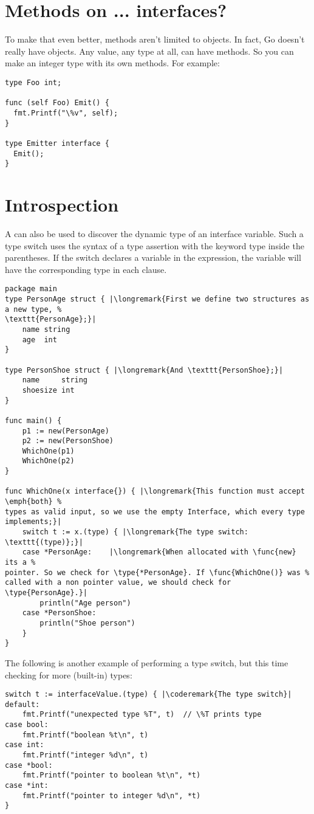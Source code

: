 \section{Methods on ... interfaces?}

To make that even better, methods aren't limited to objects. In fact, Go
doesn't really have objects. Any value, any type at all, can have methods. So
you can make an integer type with its own methods. For example:

\begin{lstlisting}
type Foo int;

func (self Foo) Emit() {
  fmt.Printf("\%v", self);
}

type Emitter interface {
  Emit();
}
\end{lstlisting}

\section{Introspection}
A  can also be used to discover the dynamic type of an interface
variable. Such a type switch uses
the syntax of a type assertion with the keyword type inside the
parentheses. If the switch declares a variable in the expression, the
variable will have the corresponding type in each clause.
\begin{lstlisting}[caption=Dynamically find out the type]
package main
type PersonAge struct { |\longremark{First we define two structures as a new type, %
\texttt{PersonAge};}|
	name string
	age  int
}

type PersonShoe struct { |\longremark{And \texttt{PersonShoe};}|
	name     string
	shoesize int
}

func main() {
	p1 := new(PersonAge)
	p2 := new(PersonShoe)
	WhichOne(p1)
	WhichOne(p2)
}

func WhichOne(x interface{}) { |\longremark{This function must accept \emph{both} %
types as valid input, so we use the empty Interface, which every type implements;}|
	switch t := x.(type) { |\longremark{The type switch: \texttt{(type)};}|
	case *PersonAge:	|\longremark{When allocated with \func{new} its a %
pointer. So we check for \type{*PersonAge}. If \func{WhichOne()} was %
called with a non pointer value, we should check for \type{PersonAge}.}|
		println("Age person")
	case *PersonShoe:
		println("Shoe person")
	}
}
\end{lstlisting}
\showremarks

The following is another example of performing a type switch, but this
time checking for more (built-in) types:
\begin{lstlisting}[caption=A more generic type switch]
switch t := interfaceValue.(type) { |\coderemark{The type switch}|
default:
    fmt.Printf("unexpected type %T", t)  // \%T prints type
case bool:
    fmt.Printf("boolean %t\n", t)
case int:
    fmt.Printf("integer %d\n", t)
case *bool:
    fmt.Printf("pointer to boolean %t\n", *t)
case *int:
    fmt.Printf("pointer to integer %d\n", *t)
}
\end{lstlisting}


